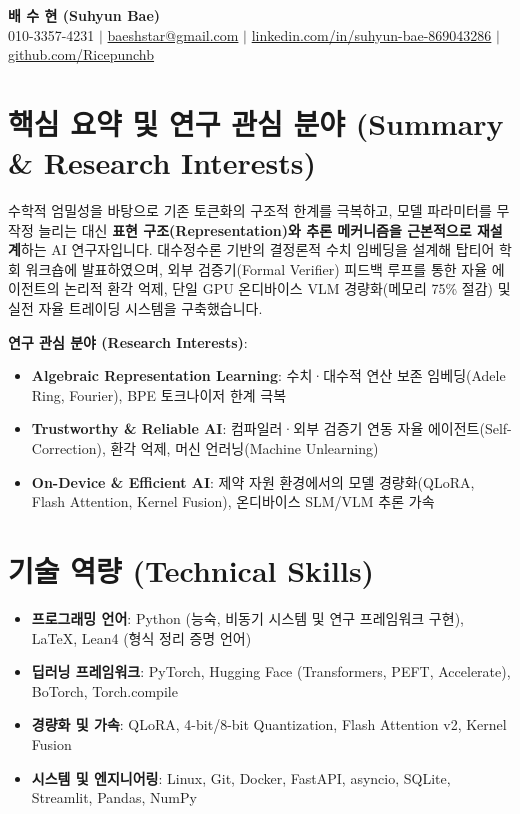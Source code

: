 \documentclass[letterpaper,10pt]{article}
\newcommand{\resumeItem}[1]{\item\small{#1}}
\newcommand{\resumeSubHeadingList}{\begin{itemize}[leftmargin=0.15in, label={}]}
\newcommand{\resumeSubHeadingListEnd}{\end{itemize}}
\begin{document}
\begin{center}
  \textbf{\Huge 배 수 현 \large (Suhyun Bae)} \\ \vspace{4pt}
  \small 010-3357-4231 $|$ 
  \href{mailto:baeshstar@gmail.com}{baeshstar@gmail.com} $|$ 
  \href{https://linkedin.com/in/suhyun-bae-869043286}{linkedin.com/in/suhyun-bae-869043286} $|$ 
  \href{https://github.com/Ricepunchb}{github.com/Ricepunchb}
\end{center}

\section{핵심 요약 및 연구 관심 분야 (Summary \& Research Interests)}
\small{
수학적 엄밀성을 바탕으로 기존 토큰화의 구조적 한계를 극복하고, 모델 파라미터를 무작정 늘리는 대신 \textbf{표현 구조(Representation)와 추론 메커니즘을 근본적으로 재설계}하는 AI 연구자입니다. 대수정수론 기반의 결정론적 수치 임베딩을 설계해 탑티어 학회 워크숍에 발표하였으며, 외부 검증기(Formal Verifier) 피드백 루프를 통한 자율 에이전트의 논리적 환각 억제, 단일 GPU 온디바이스 VLM 경량화(메모리 75\% 절감) 및 실전 자율 트레이딩 시스템을 구축했습니다.
\vspace{3pt}

\textbf{연구 관심 분야 (Research Interests)}:
\begin{itemize}[leftmargin=0.2in, itemsep=-2pt, topsep=1pt]
  \item \textbf{Algebraic Representation Learning}: 수치·대수적 연산 보존 임베딩(Adele Ring, Fourier), BPE 토크나이저 한계 극복
  \item \textbf{Trustworthy \& Reliable AI}: 컴파일러·외부 검증기 연동 자율 에이전트(Self-Correction), 환각 억제, 머신 언러닝(Machine Unlearning)
  \item \textbf{On-Device \& Efficient AI}: 제약 자원 환경에서의 모델 경량화(QLoRA, Flash Attention, Kernel Fusion), 온디바이스 SLM/VLM 추론 가속
\end{itemize}
}

\section{기술 역량 (Technical Skills)}
\resumeSubHeadingList
  \resumeItem{\textbf{프로그래밍 언어}: Python (능숙, 비동기 시스템 및 연구 프레임워크 구현), \LaTeX, Lean4 (형식 정리 증명 언어)}
  \resumeItem{\textbf{딥러닝 프레임워크}: PyTorch, Hugging Face (Transformers, PEFT, Accelerate), BoTorch, Torch.compile}
  \resumeItem{\textbf{경량화 및 가속}: QLoRA, 4-bit/8-bit Quantization, Flash Attention v2, Kernel Fusion}
  \resumeItem{\textbf{시스템 및 엔지니어링}: Linux, Git, Docker, FastAPI, asyncio, SQLite, Streamlit, Pandas, NumPy}
\resumeSubHeadingListEnd
\end{document}

